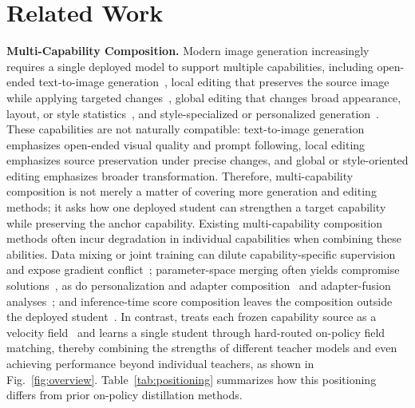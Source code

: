\section{Related Work}
\label{sec:related}

\noindent\textbf{Multi-Capability Composition.}
Modern image generation increasingly requires a single deployed model to support multiple capabilities, including open-ended text-to-image generation~\cite{rombach2022high,peebles2023scalable,cai2025z}, local editing that preserves the source image while applying targeted changes~\cite{brooks2023instructpix2pix,yu2025anyedit,bai2024humanedit}, global editing that changes broad appearance, layout, or style statistics~\cite{chow2025editmgt,chow2026editmgt_workshop}, and style-specialized or personalized generation~\cite{gal2022image,ruiz2023dreambooth,shah2024ziplora}. These capabilities are not naturally compatible: text-to-image generation emphasizes open-ended visual quality and prompt following, local editing emphasizes source preservation under precise changes, and global or style-oriented editing emphasizes broader transformation. Therefore, multi-capability composition is not merely a matter of covering more generation and editing methods; it asks how one deployed student can strengthen a target capability while preserving the anchor capability.
Existing multi-capability composition methods often incur degradation in individual capabilities when combining these abilities. Data mixing or joint training can dilute capability-specific supervision and expose gradient conflict~\cite{chen2018gradnorm,sener2018multi}; parameter-space merging often yields compromise solutions~\cite{yadav2023ties,yang2024adamerging}, as do personalization and adapter composition~\cite{kumari2023multi,shah2024ziplora} and adapter-fusion analyses~\cite{mahabadi2021parameter,chen2025empirical}; and inference-time score composition leaves the composition outside the deployed student~\cite{liu2022compositional,bar2023multidiffusion}. In contrast, \name{} treats each frozen capability source as a velocity field~\cite{lipman2022flow,liu2022flow} and learns a single student through hard-routed on-policy field matching, thereby combining the strengths of different teacher models and even achieving performance beyond individual teachers, as shown in Fig.~\ref{fig:overview}. Table~\ref{tab:positioning} summarizes how this positioning differs from prior on-policy distillation methods.




